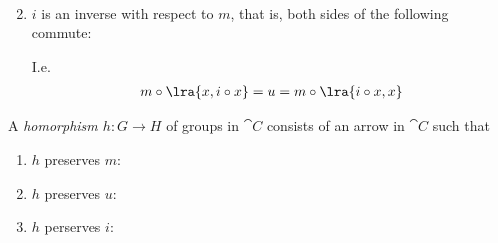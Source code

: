 \documentclass{article}
\begin{document}
\begin{definition}
\begin{enumerate}
\begin{align*}
        \end{align*}
        \item $i$ is an inverse with respect to $m$, that is, both sides of the following commute: \begin{center}
        \end{center}
        I.e. \begin{align*}
            m\circ\lra{x,i\circ x} = u = m\circ\lra{i\circ x, x}
        \end{align*}
    \end{enumerate}
\end{definition}

\begin{definition}
    A \emph{homorphism $h:G\to H$} of groups in $\cat C$ consists of an arrow in $\cat C$
    such that
    \begin{enumerate}
        \item $h$ preserves $m$: \begin{center}
        \end{center}
        \item $h$ preserves $u$: \begin{center}
        \end{center}
        \item $h$ perserves $i$: \begin{center}
        \end{center}
    \end{enumerate}
\end{definition}
\end{document}
